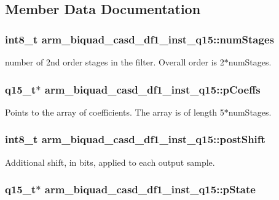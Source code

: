 \subsection{Member Data Documentation}
\hypertarget{structarm__biquad__casd__df1__inst__q15_ad6d95e70abcf4ff1300181415ad92153}{
\subsubsection[{num\-Stages}]{\setlength{\rightskip}{0pt plus 5cm}int8\-\_\-t arm\-\_\-biquad\-\_\-casd\-\_\-df1\-\_\-inst\-\_\-q15\-::num\-Stages}}\label{structarm__biquad__casd__df1__inst__q15_ad6d95e70abcf4ff1300181415ad92153}
number of 2nd order stages in the filter. Overall order is 2$\ast$num\-Stages. \hypertarget{structarm__biquad__casd__df1__inst__q15_a1edaacdebb5b09d7635bf20c779855fc}{
\subsubsection[{p\-Coeffs}]{\setlength{\rightskip}{0pt plus 5cm}q15\-\_\-t$\ast$ arm\-\_\-biquad\-\_\-casd\-\_\-df1\-\_\-inst\-\_\-q15\-::p\-Coeffs}}\label{structarm__biquad__casd__df1__inst__q15_a1edaacdebb5b09d7635bf20c779855fc}
Points to the array of coefficients. The array is of length 5$\ast$num\-Stages. \hypertarget{structarm__biquad__casd__df1__inst__q15_ada7e9d6269e6ed4eacf8f68729e9832d}{
\subsubsection[{post\-Shift}]{\setlength{\rightskip}{0pt plus 5cm}int8\-\_\-t arm\-\_\-biquad\-\_\-casd\-\_\-df1\-\_\-inst\-\_\-q15\-::post\-Shift}}\label{structarm__biquad__casd__df1__inst__q15_ada7e9d6269e6ed4eacf8f68729e9832d}
Additional shift, in bits, applied to each output sample. \hypertarget{structarm__biquad__casd__df1__inst__q15_a5481104ef2f8f81360b80b47d69ae932}{
\subsubsection[{p\-State}]{\setlength{\rightskip}{0pt plus 5cm}q15\-\_\-t$\ast$ arm\-\_\-biquad\-\_\-casd\-\_\-df1\-\_\-inst\-\_\-q15\-::p\-State}}\label{structarm__biquad__casd__df1__inst__q15_a5481104ef2f8f81360b80b47d69ae932}
